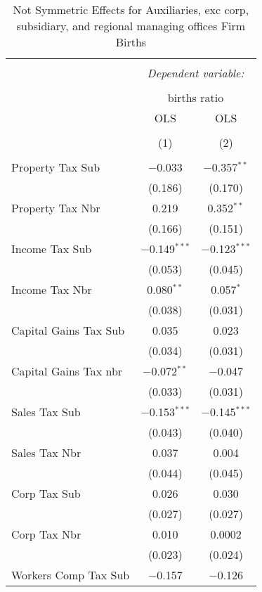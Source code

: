 
\begin{table}[!htbp] \centering 
  \caption{Not Symmetric Effects for  Auxiliaries, exc corp, subsidiary, and regional managing offices Firm Births} 
  \label{95noequality} 
\begin{tabular}{@{\extracolsep{5pt}}lcc} 
\\[-1.8ex]\hline 
\hline \\[-1.8ex] 
 & \multicolumn{2}{c}{\textit{Dependent variable:}} \\ 
\cline{2-3} 
\\[-1.8ex] & \multicolumn{2}{c}{births ratio} \\ 
 & OLS & OLS \\ 
\\[-1.8ex] & (1) & (2)\\ 
\hline \\[-1.8ex] 
 Property Tax Sub & $-$0.033 & $-$0.357$^{**}$ \\ 
  & (0.186) & (0.170) \\ 
  Property Tax Nbr & 0.219 & 0.352$^{**}$ \\ 
  & (0.166) & (0.151) \\ 
  Income Tax Sub & $-$0.149$^{***}$ & $-$0.123$^{***}$ \\ 
  & (0.053) & (0.045) \\ 
  Income Tax Nbr & 0.080$^{**}$ & 0.057$^{*}$ \\ 
  & (0.038) & (0.031) \\ 
  Capital Gains Tax Sub & 0.035 & 0.023 \\ 
  & (0.034) & (0.031) \\ 
  Capital Gains Tax nbr & $-$0.072$^{**}$ & $-$0.047 \\ 
  & (0.033) & (0.031) \\ 
  Sales Tax Sub & $-$0.153$^{***}$ & $-$0.145$^{***}$ \\ 
  & (0.043) & (0.040) \\ 
  Sales Tax Nbr & 0.037 & 0.004 \\ 
  & (0.044) & (0.045) \\ 
  Corp Tax Sub & 0.026 & 0.030 \\ 
  & (0.027) & (0.027) \\ 
  Corp Tax Nbr & 0.010 & 0.0002 \\ 
  & (0.023) & (0.024) \\ 
  Workers Comp Tax Sub & $-$0.157 & $-$0.126 \\ 

\end{tabular}
\end{table}
